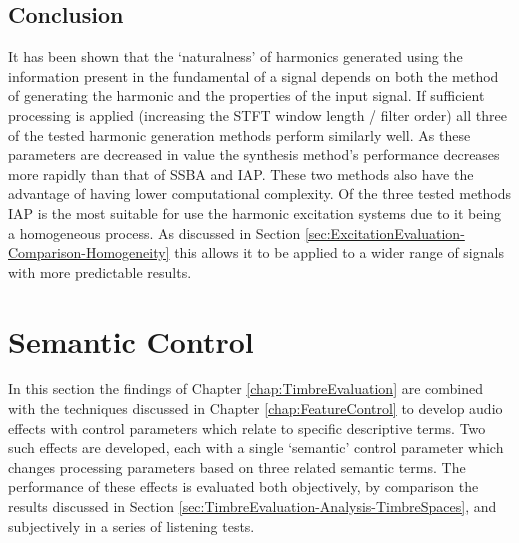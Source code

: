 	\subsection{Conclusion}
	\label{sec:PerceptualExperiments-Reconstruction-Conclusion}
		It has been shown that the `naturalness' of harmonics generated using the information present in the
		fundamental of a signal depends on both the method of generating the harmonic and the properties of the
		input signal. If sufficient processing is applied (increasing the STFT window length / filter order) all
		three of the tested harmonic generation methods perform similarly well. As these parameters are decreased
		in value the synthesis method's performance decreases more rapidly than that of SSBA and IAP. These two
		methods also have the advantage of having lower computational complexity. Of the three tested methods IAP
		is the most suitable for use the harmonic excitation systems due to it being a homogeneous process. As
		discussed in Section \ref{sec:ExcitationEvaluation-Comparison-Homogeneity} this allows it to be applied to
		a wider range of signals with more predictable results.

\section{Semantic Control}
\label{sec:PerceptualExperiments-SemanticControl}
	In this section the findings of Chapter \ref{chap:TimbreEvaluation} are combined with the techniques discussed in
	Chapter \ref{chap:FeatureControl} to develop audio effects with control parameters which relate to specific
	descriptive terms. Two such effects are developed, each with a single `semantic' control parameter which changes
	processing parameters based on three related semantic terms. The performance of these effects is evaluated both
	objectively, by comparison the results discussed in Section \ref{sec:TimbreEvaluation-Analysis-TimbreSpaces}, and
	subjectively in a series of listening tests.

